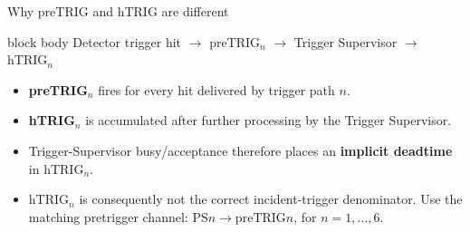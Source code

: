 \documentclass[aspectratio=169,11pt]{beamer}
\begin{document}
\begin{frame}{Why preTRIG and hTRIG are different}
\centering
\vspace{2mm}
\begin{beamercolorbox}[rounded=true,sep=3mm,wd=0.94\textwidth]{block body}
  \centering\large
  Detector trigger hit
  \(\longrightarrow\)
  \alert{preTRIG\(_n\)}
  \(\longrightarrow\)
  Trigger Supervisor
  \(\longrightarrow\)
  \alert{hTRIG\(_n\)}
\end{beamercolorbox}

\vspace{5mm}
\begin{itemize}\setlength\itemsep{3mm}
  \item \textbf{preTRIG\(_n\)} fires for every hit delivered by trigger path \(n\).
  \item \textbf{hTRIG\(_n\)} is accumulated after further processing by the Trigger Supervisor.
  \item Trigger-Supervisor busy/acceptance therefore places an \textbf{implicit deadtime} in hTRIG\(_n\).
  \item hTRIG\(_n\) is consequently not the correct incident-trigger denominator. Use the matching pretrigger channel: \(\mathrm{PS}n\rightarrow\mathrm{preTRIG}n\), for \(n=1,\ldots,6\).
\end{itemize}
\end{frame}
\end{document}
